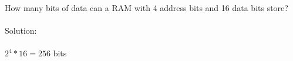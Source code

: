 How many bits of data can a RAM with 4 address bits and 16 data bits store?\\ \\

Solution: \\ \\
$2^4*16 = 256$ bits
